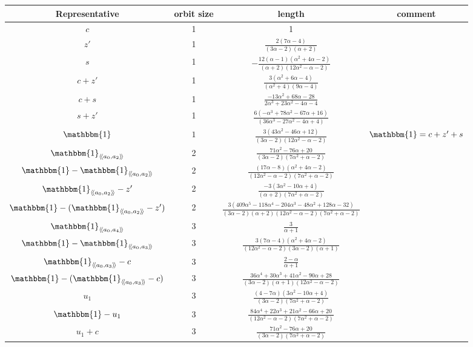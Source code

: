 \documentclass[11pt, a4paper]{article}
\theoremstyle{plain}
\theoremstyle{definition}
\newcommand\al{\alpha}
\newcommand\lla{\langle\!\langle}
\newcommand\rra{\rangle\!\rangle}
\newcommand{\0}{\overline{0}}
\newcommand{\2}{\overline{2}}
\newcommand{\1}{\mathbbm{1}}
\begin{document}
\begin{table}[h!tb]
	\centering
	\footnotesize
	\begin{tabular}{cccc}
		\hline
		Representative & orbit size & length & comment \\
		\hline
		$c$ & 1 & 1 & \\
		$z'$ & 1 & $\frac{2(7\al-4)}{(3\al-2)(\al+2)}$ & \\
		$s$ & 1 & $-\frac{12(\al-1)(\al^2+4\al-2)}{(\al+2)(12\al^2-\al-2)}$ & \\
		$c+z'$ & 1 & $\frac{3(\al^2 + 6\al - 4)}{(\al^2 + 4)(9\al - 4)}$ & \\
		$c+s$ & 1& $\frac{-13\al^2 + 68\al - 28}{2\al^3 + 23\al^2 - 4\al - 4}$ & \\
		$s+z'$ & 1 & $\frac{6(-\al^3 + 78\al^2 - 67\al + 16)}{(36\al^3 - 27\al^2 - 4\al + 4)}$ & \\
		$\1$ & $1$ &  $\frac{3(43\al^2 - 46\al + 12)}{(3\al - 2)(12\al^2 - \al - 2)}$ & $\1 = c+z'+s$ \\
		$\1_{\lla a_0,a_2 \rra}$ & 2 & $\frac{71\al^2 - 76\al + 20}{(3\al - 2)(7\al^2 + \al - 2)}$ & \\
		$\1 - \1_{\lla a_0,a_2 \rra}$ & 2 & $\frac{(17\al - 8)(\al^2 + 4\al - 2)}{(12\al^2 - \al - 2)(7\al^2 + \al - 2)}$ & \\
		$\1_{\lla a_0,a_2 \rra} - z'$ & 2 & $\frac{-3(3\al^2 - 10\al + 4)}{(\al + 2)(7\al^2 + \al - 2)}$ & \\
		$\1 -(\1_{\lla a_0,a_2 \rra}-z')$ & 2 & $\frac{3(409\al^5 - 118\al^4 - 204\al^3 - 48\al^2 + 128\al - 32)}{(3\al - 2)(\al+2)(12\al^2 - \al - 2)(7\al^2 + \al - 2)}$ & \\
		$\1_{\lla a_0,a_4 \rra}$ & 3 & $\frac{3}{\al+1}$ & \\
		$\1 - \1_{\lla a_0,a_3 \rra}$ & 3 & $\frac{3(7\al - 4)(\al^2 + 4\al - 2)}{(12\al^2 - \al - 2)(3\al - 2)(\al+1)}$ & \\
		$\1_{\lla a_0,a_3 \rra}-c$ & 3 & $\frac{2-\al}{\al+1}$ & \\
		$\1 - (\1_{\lla a_0,a_3 \rra}-c)$ & 3 & $\frac{36\al^4+30\al^3+ 41\al^2 - 90\al+28}{(3 \al - 2)(\al+1)(12\al^2 - \al - 2)}$ & \\
		$u_1$ & 3 & $\frac{(4-7\al)(3\al^2 - 10\al + 4)}{(3\al - 2)(7\al^2 + \al - 2)}$ & \\
		$\1 - u_1$ & 3 & $\frac{84\al^4 + 22\al^3 + 21\al^2 - 66\al + 20}{(12\al^2 - \al - 2)(7\al^2 + \al - 2)}$ & \\
		$u_1+c$ & 3 & $\frac{71\al^2 - 76\al + 20}{(3\al - 2)(7\al^2 + \al - 2)}$ & \\

\end{tabular}
\end{table}
\end{document}
